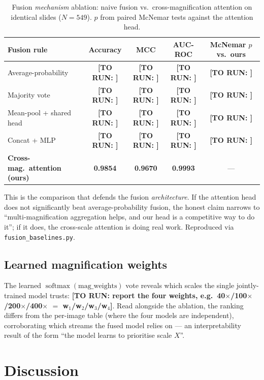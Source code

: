\documentclass[11pt]{article}
\DeclareMathOperator*{\softmax}{softmax}
\newcommand{\todo}[1]{{\color{red}\textbf{[TO RUN: #1]}}}
\begin{document}
\begin{table}[t]
\centering
\caption{Fusion \emph{mechanism} ablation: naive fusion vs.\ cross-magnification
attention on identical slides ($N=549$). $p$ from paired McNemar tests against the
attention head.}
\label{tab:fusion-baselines}
\small
\begin{tabular}{@{}lcccc@{}}
\toprule
Fusion rule & Accuracy & MCC & AUC-ROC & McNemar $p$ vs.\ ours \\
\midrule
Average-probability      & \todo{} & \todo{} & \todo{} & \todo{} \\
Majority vote            & \todo{} & \todo{} & \todo{} & \todo{} \\
Mean-pool + shared head  & \todo{} & \todo{} & \todo{} & \todo{} \\
Concat + MLP             & \todo{} & \todo{} & \todo{} & \todo{} \\
\textbf{Cross-mag.\ attention (ours)} & \textbf{0.9854} & \textbf{0.9670} & \textbf{0.9993} & --- \\
\bottomrule
\end{tabular}
\end{table}

\noindent This is the comparison that defends the fusion \emph{architecture}. If
the attention head does not significantly beat average-probability fusion, the
honest claim narrows to ``multi-magnification aggregation helps, and our head is a
competitive way to do it''; if it does, the cross-scale attention is doing real
work. Reproduced via \texttt{fusion\_baselines.py}.

\subsection{Learned magnification weights}
The learned $\softmax(\text{mag\_weights})$ vote reveals which scales the single
jointly-trained model trusts: \todo{report the four weights, e.g.\ 40$\times$/100$\times$/200$\times$/400$\times$ $=$ w$_1$/w$_2$/w$_3$/w$_4$}.
Read alongside the ablation, the ranking differs from
the per-image table (where the four models are independent), corroborating which
streams the fused model relies on — an interpretability result of the form ``the
model learns to prioritise scale $X$''.

\section{Discussion}
\label{sec:discussion}
\end{document}
